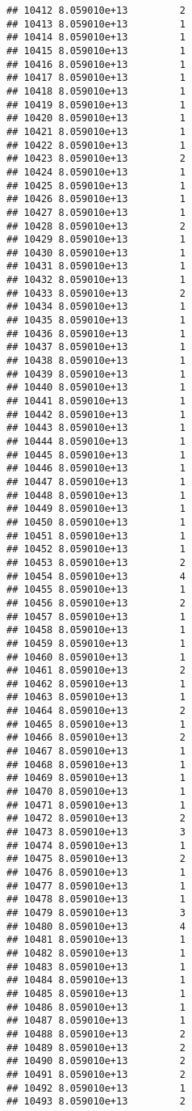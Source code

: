 \documentclass[
]{article}
\begin{document}
\begin{verbatim}
## 10412 8.059010e+13         2
## 10413 8.059010e+13         1
## 10414 8.059010e+13         1
## 10415 8.059010e+13         1
## 10416 8.059010e+13         1
## 10417 8.059010e+13         1
## 10418 8.059010e+13         1
## 10419 8.059010e+13         1
## 10420 8.059010e+13         1
## 10421 8.059010e+13         1
## 10422 8.059010e+13         1
## 10423 8.059010e+13         2
## 10424 8.059010e+13         1
## 10425 8.059010e+13         1
## 10426 8.059010e+13         1
## 10427 8.059010e+13         1
## 10428 8.059010e+13         2
## 10429 8.059010e+13         1
## 10430 8.059010e+13         1
## 10431 8.059010e+13         1
## 10432 8.059010e+13         1
## 10433 8.059010e+13         2
## 10434 8.059010e+13         1
## 10435 8.059010e+13         1
## 10436 8.059010e+13         1
## 10437 8.059010e+13         1
## 10438 8.059010e+13         1
## 10439 8.059010e+13         1
## 10440 8.059010e+13         1
## 10441 8.059010e+13         1
## 10442 8.059010e+13         1
## 10443 8.059010e+13         1
## 10444 8.059010e+13         1
## 10445 8.059010e+13         1
## 10446 8.059010e+13         1
## 10447 8.059010e+13         1
## 10448 8.059010e+13         1
## 10449 8.059010e+13         1
## 10450 8.059010e+13         1
## 10451 8.059010e+13         1
## 10452 8.059010e+13         1
## 10453 8.059010e+13         2
## 10454 8.059010e+13         4
## 10455 8.059010e+13         1
## 10456 8.059010e+13         2
## 10457 8.059010e+13         1
## 10458 8.059010e+13         1
## 10459 8.059010e+13         1
## 10460 8.059010e+13         1
## 10461 8.059010e+13         2
## 10462 8.059010e+13         1
## 10463 8.059010e+13         1
## 10464 8.059010e+13         2
## 10465 8.059010e+13         1
## 10466 8.059010e+13         2
## 10467 8.059010e+13         1
## 10468 8.059010e+13         1
## 10469 8.059010e+13         1
## 10470 8.059010e+13         1
## 10471 8.059010e+13         1
## 10472 8.059010e+13         2
## 10473 8.059010e+13         3
## 10474 8.059010e+13         1
## 10475 8.059010e+13         2
## 10476 8.059010e+13         1
## 10477 8.059010e+13         1
## 10478 8.059010e+13         1
## 10479 8.059010e+13         3
## 10480 8.059010e+13         4
## 10481 8.059010e+13         1
## 10482 8.059010e+13         1
## 10483 8.059010e+13         1
## 10484 8.059010e+13         1
## 10485 8.059010e+13         1
## 10486 8.059010e+13         1
## 10487 8.059010e+13         1
## 10488 8.059010e+13         2
## 10489 8.059010e+13         2
## 10490 8.059010e+13         2
## 10491 8.059010e+13         2
## 10492 8.059010e+13         1
## 10493 8.059010e+13         2

\end{verbatim}
\end{document}

